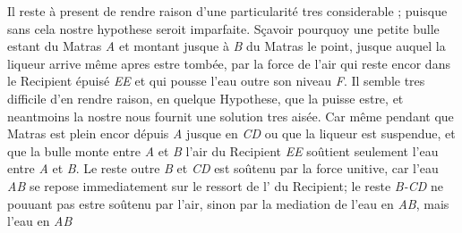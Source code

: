                     \pstart {} Il reste \`{a} present de rendre raison d'une particularit\'{e} tres considerable ; puisque sans cela nostre hypothese seroit imparfaite.                         S\c{c}avoir pourquoy une petite bulle estant  du Matras \textit{A} et montant jusque \`{a} \textit{B}  du Matras le point, jusque auquel la liqueur\protect{}  arrive même apres estre tomb\'{e}e, par la force de l'air qui reste encor dans le Recipient \'{e}puis\'{e} \textit{EE} et qui pousse l'eau outre son niveau \textit{F}. Il semble tres difficile d'en rendre raison, en quelque Hypothese, que la puisse estre, et neantmoins la nostre nous fournit une solution tres ais\'{e}e. Car même pendant que  Matras est plein encor d\'{e}puis \textit{A} jusque en \textit{CD} ou que la liqueur\protect{} est 
suspendue, et que la bulle monte entre \textit{A} et \textit{B} l'air du Recipient \textit{EE} soûtient seulement l'eau entre \textit{A} et \textit{B}. Le reste outre \textit{B} et \textit{CD} est soûtenu par la force unitive, car l'eau \textit{AB} se repose immediatement sur le ressort de l' du Recipient; le reste \textit{B-CD} ne pouuant pas estre soûtenu par l'air, sinon par la mediation de l'eau en \textit{AB}, mais l'eau en \textit{AB}